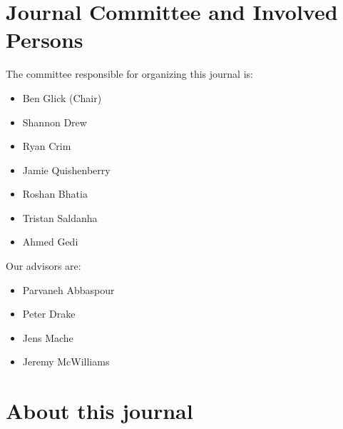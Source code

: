 \documentclass[12pt]{article}
\begin{document}
\begin{titlepage}
	
	
    
    
    
    
	
\end{titlepage}




\section{Journal Committee and Involved Persons}
The committee responsible for organizing this journal is:
\begin{itemize}
  \item Ben Glick (Chair)
  \item Shannon Drew
  \item Ryan Crim
  \item Jamie Quishenberry
  \item Roshan Bhatia
  \item Tristan Saldanha
  \item Ahmed Gedi
\end{itemize}
Our advisors are:
\begin{itemize}
  \item Parvaneh Abbaspour
  \item Peter Drake
  \item Jens Mache
  \item Jeremy McWilliams
\end{itemize}

\section{About this journal}

\newpage


\end{document}
